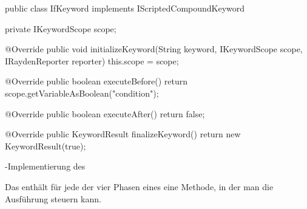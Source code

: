 \begin{program}
\begin{JavaCode}
public class IfKeyword implements IScriptedCompoundKeyword {

  private IKeywordScope scope;

  @Override
  public void initializeKeyword(String keyword, IKeywordScope scope, IRaydenReporter reporter) {
    this.scope = scope;
  }

  @Override
  public boolean executeBefore() {
    return scope.getVariableAsBoolean("condition");
  }

  @Override
  public boolean executeAfter() {
    return false;
  }
  
  @Override
  public KeywordResult finalizeKeyword() {
    return new KeywordResult(true);
  }
}
\end{JavaCode}
\caption{-Implementierung des }
\label{prog:ifKeywordImpl}
\end{program}

\SuperPar
Das  enthält für jede der vier Phasen eines  eine Methode, in der man die Ausführung steuern kann. \\

